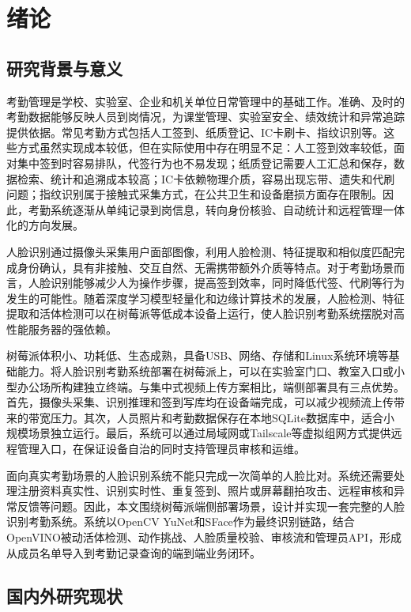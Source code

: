 \chapter{绪论}

\section{研究背景与意义}

考勤管理是学校、实验室、企业和机关单位日常管理中的基础工作。准确、及时的考勤数据能够反映人员到岗情况，为课堂管理、实验室安全、绩效统计和异常追踪提供依据。常见考勤方式包括人工签到、纸质登记、IC卡刷卡、指纹识别等。这些方式虽然实现成本较低，但在实际使用中存在明显不足：人工签到效率较低，面对集中签到时容易排队，代签行为也不易发现；纸质登记需要人工汇总和保存，数据检索、统计和追溯成本较高；IC卡依赖物理介质，容易出现忘带、遗失和代刷问题；指纹识别属于接触式采集方式，在公共卫生和设备磨损方面存在限制。因此，考勤系统逐渐从单纯记录到岗信息，转向身份核验、自动统计和远程管理一体化的方向发展。

人脸识别通过摄像头采集用户面部图像，利用人脸检测、特征提取和相似度匹配完成身份确认，具有非接触、交互自然、无需携带额外介质等特点。对于考勤场景而言，人脸识别能够减少人为操作步骤，提高签到效率，同时降低代签、代刷等行为发生的可能性。随着深度学习模型轻量化和边缘计算技术的发展，人脸检测、特征提取和活体检测可以在树莓派等低成本设备上运行，使人脸识别考勤系统摆脱对高性能服务器的强依赖。

树莓派体积小、功耗低、生态成熟，具备USB、网络、存储和Linux系统环境等基础能力。将人脸识别考勤系统部署在树莓派上，可以在实验室门口、教室入口或小型办公场所构建独立终端。与集中式视频上传方案相比，端侧部署具有三点优势。首先，摄像头采集、识别推理和签到写库均在设备端完成，可以减少视频流上传带来的带宽压力。其次，人员照片和考勤数据保存在本地SQLite数据库中，适合小规模场景独立运行。最后，系统可以通过局域网或Tailscale等虚拟组网方式提供远程管理入口，在保证设备自治的同时支持管理员审核和运维。

面向真实考勤场景的人脸识别系统不能只完成一次简单的人脸比对。系统还需要处理注册资料真实性、识别实时性、重复签到、照片或屏幕翻拍攻击、远程审核和异常反馈等问题。因此，本文围绕树莓派端侧部署场景，设计并实现一套完整的人脸识别考勤系统。系统以OpenCV YuNet和SFace作为最终识别链路，结合OpenVINO被动活体检测、动作挑战、人脸质量校验、审核流和管理员API，形成从成员名单导入到考勤记录查询的端到端业务闭环。

\section{国内外研究现状}


